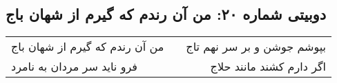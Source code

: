 \begin{center}
\section*{دوبیتی شماره ۲۰: من آن رندم که گیرم از شهان باج}
\label{sec:020}
\begin{longtable}{l p{0.5cm} r}
من آن رندم که گیرم از شهان باج
&&
بپوشم جوشن و بر سر نهم تاج
\\
فرو ناید سر مردان به نامرد
&&
اگر دارم کشند مانند حلاج
\\
\end{longtable}
\end{center}
